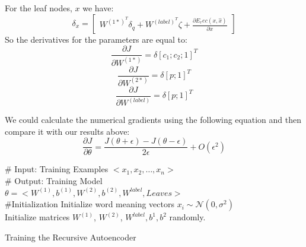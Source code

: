 \documentclass[twoside,12pt]{article}
\begin{document}
For the leaf nodes, $x$ we have:
\begin{equation}
\delta_x=
\begin{bmatrix}
W^{{(1*)}^T}\delta_q+W^{{(label)}^T}\zeta+\frac{\partial E_rec(x,\hat{x})}{\partial x}
\end{bmatrix}
\end{equation}
So the derivatives for the parameters are equal to:
\begin{equation}
\frac{\partial J}{\partial W^{(1*)}}=\delta[c_1;c_2;1]^T
\end{equation}
\begin{equation}
\frac{\partial J}{\partial W^{(2*)}}=\delta[p;1]^T
\end{equation}
\begin{equation}
\frac{\partial J}{\partial W^{(label)}}=\delta[p;1]^T
\end{equation}

We could calculate the numerical gradients using the following equation and then compare it with our results above:
\begin{equation}
\frac{\partial J}{\partial \theta}=\frac{J(\theta+\epsilon)-J(\theta-\epsilon)}{2\epsilon}+O(\epsilon^2)
\end{equation}
\begin{algorithm}[h!]
\# Input: Training Examples $<x_1, x_2, \ldots, x_n>$\\ 
\# Output: Training Model\\$\theta=<W^{(1)},b^{(1)},W^{(2)},b^{(2)},W^{label},Leaves>$\\ 
\#Initialization
Initialize word meaning vectors $x_i \sim \mathcal{N}(0,\sigma^2)$\\
Initialize matrices $W^{(1)}$, $W^{(2)}$, $W^{label}, b^{1},b^{2}$ randomly.\\
\caption{Training the Recursive Autoencoder}
\label{algorithm RA}
\end{algorithm}
\end{document}
